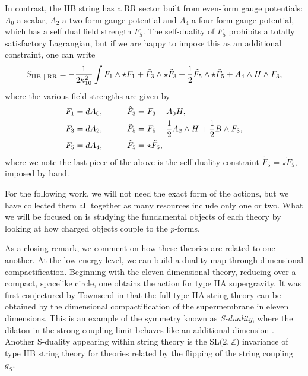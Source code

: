 In contrast, the IIB string has a RR sector built from even-form gauge potentials: $A_0$ a scalar, $A_2$ a two-form gauge potential  and $A_4$ a four-form gauge potential, which has a self dual field strength $F_5$. The self-duality of $F_5$ prohibits a totally satisfactory Lagrangian, but if we are happy to impose this as an additional constraint, one can write \cite{DHoker:2002nbb}
\begin{equation*}
	S_{\text{IIB | RR}} = - \frac{1}{2 \kappa_{10}^2} \int F_1 \wedge \star F_1 +  \tilde{F}_3 \wedge \star \tilde{F}_3 + \frac{1}{2} \tilde{F}_5 \wedge \star \tilde{F}_5 + A_4 \wedge H \wedge F_3,
\end{equation*}
where the various field strengths are given by
\begin{equation*}
	\begin{aligned}
		F_1 &= dA_0, \qquad  &&\tilde{F}_3 = F_3 - A_0 H, \\
		F_3 &= dA_2, \qquad &&\tilde{F}_5 = F_5 - \frac{1}{2} A_2 \wedge H + \frac{1}{2} B \wedge F_3, \\
		F_5 &= dA_4,  \qquad &&\tilde{F}_5 = \star	\tilde{F}_5, 
	\end{aligned}
\end{equation*}
where we note the last piece of the above is the self-duality constraint $\tilde{F}_5 = \star	\tilde{F}_5$, imposed by hand.

For the following work, we will not need the exact form of the actions, but we have collected them all together as many resources include only one or two. What we will be focused on is studying the fundamental objects of each theory by looking at how charged objects couple to the $p$-forms. 

As a closing remark, we comment on how these theories are related to one another. At the low energy level, we can build a duality map through dimensional compactification. Beginning with the eleven-dimensional theory, reducing  over a compact, spacelike circle, one obtains the action for type IIA supergravity. It was first conjectured by Townsend in \cite{Townsend:1995kk} that the full type IIA string theory can be obtained by the dimensional compactification of the supermembrane in eleven dimensions. This is an example of the symmetry known as \emph{S-duality}, where the dilaton in the strong coupling limit behaves like an additional dimension \cite{Schwarz:1998tz}. Another S-duality appearing within string theory is the SL$(2,\mathbb{Z}$) invariance of type IIB string theory for theories related by the flipping of the string coupling $g_S$\cite{Sen:1994fa}.

